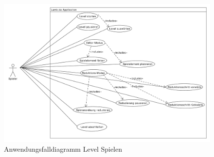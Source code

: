 \begin{figure}[H]
\centering
\includegraphics[scale=0.40]{../use_cases/play_level.pdf}
\caption{Anwendungsfalldiagramm Level Spielen}
\end{figure}